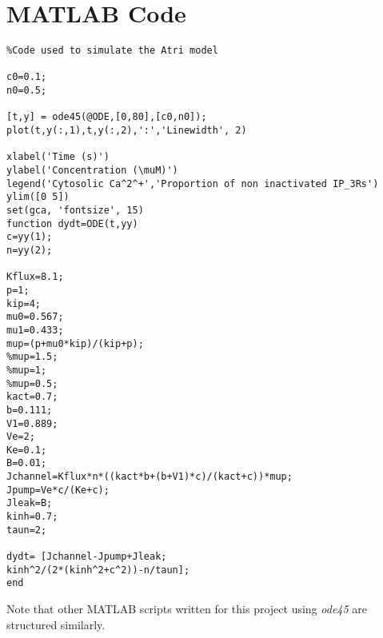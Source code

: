 \chapter{MATLAB Code}
\begin{lstlisting}
%Code used to simulate the Atri model

c0=0.1;
n0=0.5;

[t,y] = ode45(@ODE,[0,80],[c0,n0]);
plot(t,y(:,1),t,y(:,2),':','Linewidth', 2)

xlabel('Time (s)')
ylabel('Concentration (\muM)')
legend('Cytosolic Ca^2^+','Proportion of non inactivated IP_3Rs')
ylim([0 5])
set(gca, 'fontsize', 15)
function dydt=ODE(t,yy)
c=yy(1);
n=yy(2);

Kflux=8.1;
p=1;
kip=4;
mu0=0.567;
mu1=0.433;
mup=(p+mu0*kip)/(kip+p);
%mup=1.5;
%mup=1;
%mup=0.5;
kact=0.7;
b=0.111;
V1=0.889;
Ve=2;
Ke=0.1;
B=0.01;
Jchannel=Kflux*n*((kact*b+(b+V1)*c)/(kact+c))*mup;
Jpump=Ve*c/(Ke+c);
Jleak=B;
kinh=0.7;
taun=2;

dydt= [Jchannel-Jpump+Jleak;
kinh^2/(2*(kinh^2+c^2))-n/taun];
end
\end{lstlisting}
Note that other MATLAB scripts written for this project using \textit{ode45} are structured similarly.